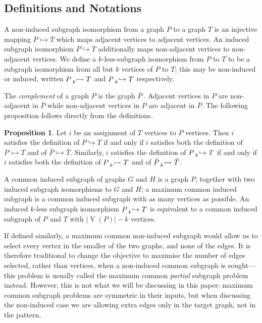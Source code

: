 \documentclass[letterpaper]{article}
\theoremstyle{definition}
\newtheorem{proposition}{Proposition}
\newcommand{\lessnonind}[1]{\prescript{}{#1}{\rightarrowtail}\ }
\newcommand{\lessind}[1]{\prescript{}{#1}{\hookrightarrow}\ }
\newcommand{\V}{\operatorname{V}}
\begin{document}
\subsection{Definitions and Notations}

A non-induced subgraph isomorphism from a graph $P$ to a graph $T$ is an injective mapping $P
\rightarrowtail T $ which maps adjacent vertices to adjacent vertices. An induced subgraph
isomorphism $P \hookrightarrow T$ additionally maps non-adjacent vertices to non-adjacent vertices.
We define a $k$-less-subgraph isomorphism from $P$ to $T$ to be a subgraph isomorphism from all but
$k$ vertices of $P$ to $T$; this may be non-induced or induced, written $P \lessnonind{k} T$ and $P
\lessind{k} T$ respectively.

The \emph{complement} of a graph $P$ is the graph $\bar{P}~$.  Adjacent vertices in $P$ are
non-adjacent in $\bar{P}$ while non-adjacent vertices in $P$ are adjacent in $\bar{P}$. The
following proposition follows directly from the definitions.

\begin{proposition}\label{prop:comp}
Let $i$ be an assignment of $T$ vertices to $P$ vertices.  Then $i$ satisfies the definition of $P
\hookrightarrow T$ if and only if $i$ satisfies both the definition of $P \rightarrowtail T$ and
of $\bar{P} \rightarrowtail \bar{T}$.
Similarly, $i$ satisfies the definition of $P
\lessind{k} T$ if and only if $i$ satisfies both the definition of $P \lessnonind{k} T$ and of
$\bar{P}
\lessnonind{k} \bar{T}$.
\end{proposition}

A common induced subgraph of graphs $G$ and $H$ is a graph $P$, together with two induced subgraph
isomorphisms to $G$ and $H$; a maximum common induced subgraph is a common induced subgraph with as
many vertices as possible. An induced $k$-less subgraph isomorphism $P \lessind{k} T$ is equivalent
to a common induced subgraph of $P$ and $T$ with $\left|\V(P)\right| - k$ vertices.

If defined similarly, a maximum common non-induced subgraph would allow us to select every vertex in
the smaller of the two graphs, and none of the edges. It is therefore traditional to change the
objective to maximise the number of edges selected, rather than vertices, when a non-induced common
subgraph is sought---this problem is usually called the maximum common \emph{partial} subgraph
problem instead. However, this is not what we will be discussing in this paper: maximum common
subgraph problems are symmetric in their inputs, but when discussing the non-induced case we are
allowing extra edges only in the target graph, not in the pattern.
\end{document}
